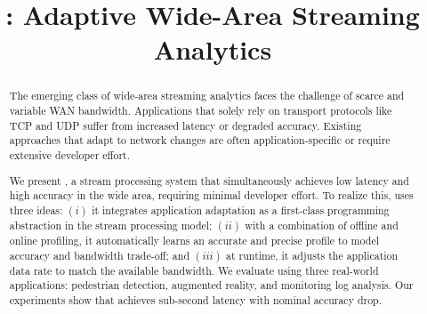 \documentclass[sigplan,10pt,anonymous]{acmart}
\begin{document}


\title{\sysname{}: Adaptive Wide-Area Streaming Analytics}
\gdef\addresses{Paper \textbf{\#200}, 12 pages}

\begin{abstract}
  The emerging class of wide-area streaming analytics faces the challenge of
  scarce and variable WAN bandwidth. Applications that solely rely on
  transport protocols like TCP and UDP suffer from increased latency or degraded
  accuracy. Existing approaches that adapt to network changes are often
  application-specific or require extensive developer effort.

  We present \sysname{}, a stream processing system that simultaneously achieves
  low latency and high accuracy in the wide area, requiring minimal developer
  effort. To realize this, \sysname{} uses three ideas: $(i)$ it integrates
  application adaptation as a first-class programming abstraction in the stream
  processing model; $(ii)$ with a combination of offline and online profiling,
  it automatically learns an accurate and precise profile to model accuracy and
  bandwidth trade-off; and $(iii)$ at runtime, it adjusts the application data rate
  to match the available bandwidth. We evaluate \sysname{} using three
  real-world applications: pedestrian detection, augmented reality, and
  monitoring log analysis. Our experiments show that \sysname{} achieves
  sub-second latency with nominal accuracy drop.
\end{abstract}

\maketitle











\def \bibfont {\normalsize}

\end{document}
